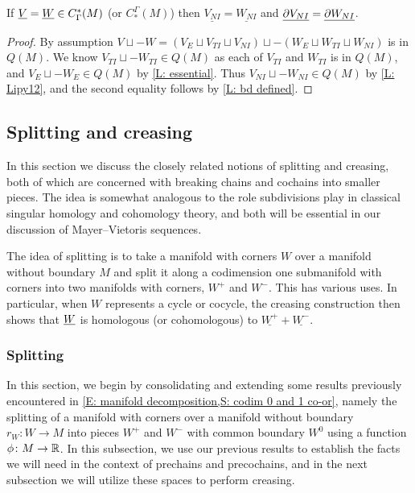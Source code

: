 \begin{corollary}\label{L: same NI}
	If $\underline{V} = \underline{W} \in C^*_\Gamma(M)$ (or $C_*^\Gamma(M)$) then
	$\underline{ V_{NI}} = \underline{ W_{NI}}$ and
	$\underline{\partial V_{NI}} = \underline{\partial W_{NI}}$.
\end{corollary}

\begin{proof}
	By assumption $V\sqcup-W = (V_E \sqcup V_{TI} \sqcup V_{NI}) \sqcup -(W_E \sqcup W_{TI} \sqcup W_{NI})$ is in $Q(M)$.
	We know $V_{TI} \sqcup -W_{TI} \in Q(M)$ as each of $V_{TI}$ and $W_{TI}$ is in $Q(M)$, and $V_E \sqcup -W_E \in Q(M)$ by \cref{L: essential}.
	Thus $V_{NI} \sqcup -W_{NI} \in Q(M)$ by \cref{L: Lipy12}, and the second equality follows by \cref{L: bd defined}.
\end{proof}





\subsection{Splitting and creasing}\label{S: splitting and creasing}

In this section we discuss the closely related notions of splitting and creasing, both of which are concerned with breaking chains and cochains into smaller pieces.
The idea is somewhat analogous to the role subdivisions play in classical singular homology and cohomology theory, and both will be essential in our discussion of Mayer--Vietoris sequences.

The idea of splitting is to take a manifold with corners $W$ over a manifold without boundary $M$ and split it along a codimension one submanifold with corners into two manifolds with corners, $W^+$ and $W^-$.
This has various uses.
In particular, when $W$ represents a cycle or cocycle, the creasing construction then shows that $\underline{W}$ is homologous (or cohomologous) to $\underline{W^+} + \underline{W^-}$.


\subsubsection{Splitting}\label{S: splitting}
In this section, we begin by consolidating and extending some results previously encountered in \cref{E: manifold decomposition,S: codim 0 and 1 co-or}, namely the splitting of a manifold with corners over a manifold without boundary $r_W \colon W \to M$ into pieces $W^+$ and $W^-$ with common boundary $W^0$ using a function $\phi \colon M \to \mathbb{R}$.
In this subsection, we use our previous results to establish the facts we will need in the context of prechains and precochains, and in the next subsection we will utilize these spaces to perform creasing.

